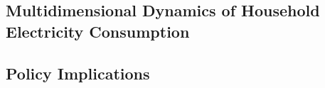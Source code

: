
\subsection{Multidimensional Dynamics of Household Electricity Consumption}
\label{Subsection:Multidimensional-Dynamics-of-Household-Electricity-Consumption}



\subsection{Policy Implications}
\label{Subsection:Policy-Implications}


